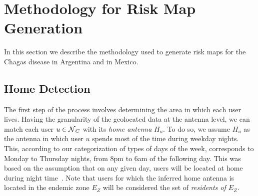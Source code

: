 %





\section{Methodology for Risk Map Generation} \label{methods}

In this section we describe the methodology used to generate risk maps for the Chagas disease in Argentina and in Mexico.

\subsection{Home Detection}

    The first step of the process involves determining the area in which each user lives. Having the granularity of the geolocated data at the antenna level, we can match each user $u \in \operatorname{\mathcal{N}}_C$ with its \textit{home antenna} $H_u$.  To do so, we assume $H_u$ as the antenna in which user $u$ spends most of the time during weekday nights. This, according to our categorization of types of days of the week, corresponds to Monday to Thursday nights, from 8pm to 6am of the following day. This was based on the assumption that on any given day, users will be located at home during night time~\cite{sarraute2015socialevents,csaji2012exploring}. 
   Note that users for which the inferred home antenna is located in the endemic zone $E_Z$ will be considered the set of \textit{residents of $E_Z$}.

